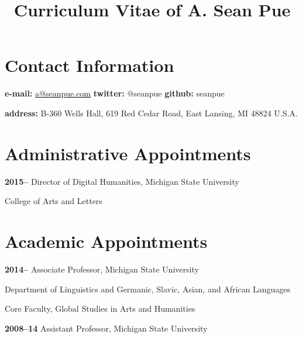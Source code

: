 \documentclass[letterpaper,12pt]{article}
\title{\phantomsection%
  Curriculum Vitae of A. Sean Pue%
  \label{curriculum-vitae-of-a-sean-pue}}
\author{}
\date{}
\newenvironment{DUlineblock}[1]{%
    \list{}{\setlength{\partopsep}{\parskip}
            \addtolength{\partopsep}{\baselineskip}
            \setlength{\topsep}{0pt}
            \setlength{\itemsep}{0.15\baselineskip}
            \setlength{\parsep}{0pt}
            \setlength{\leftmargin}{#1}}
    \raggedright
  }
  {\endlist}
\begin{document}
\maketitle


\section{Contact Information%
  \label{contact-information}%
}

\begin{DUlineblock}{0em}
\item[] \textbf{e-mail:}
\href{mailto:a@seanpue.com}{a@seanpue.com}
\textbf{twitter:}
@seanpue
\textbf{github:}
seanpue
\item[] \textbf{address:}
B-360 Wells Hall, 619 Red Cedar Road, East Lansing, MI 48824 U.S.A.
\end{DUlineblock}


\section{Administrative Appointments%
  \label{administrative-appointments}%
}

\begin{DUlineblock}{0em}
\item[] \textbf{2015–}
Director of Digital Humanities, Michigan State University
\item[]
\begin{DUlineblock}{\DUlineblockindent}
\item[] College of Arts and Letters
\end{DUlineblock}
\end{DUlineblock}


\section{Academic Appointments%
  \label{academic-appointments}%
}

\begin{DUlineblock}{0em}
\item[] \textbf{2014–}
Associate Professor, Michigan State University
\item[]
\begin{DUlineblock}{\DUlineblockindent}
\item[] Department of Linguistics and Germanic, Slavic, Asian, and African Languages
\item[] Core Faculty, Global Studies in Arts and Humanities
\end{DUlineblock}
\item[] \textbf{2008–14}
Assistant Professor, Michigan State University
\end{DUlineblock}
\end{document}

